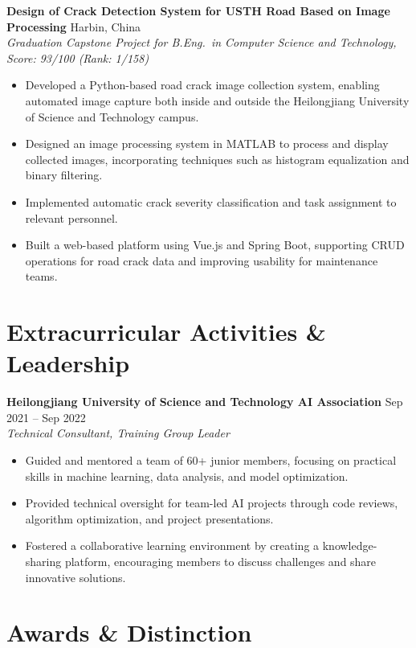\documentclass[10pt,a4paper]{article}
\begin{document}
\textbf{Design of Crack Detection System for USTH Road Based on Image Processing} \hfill Harbin, China\\
\textit{Graduation Capstone Project for B.Eng.\ in Computer Science and Technology, Score: 93/100 (Rank: 1/158)}
\begin{itemize}
    \item Developed a Python-based road crack image collection system, enabling automated image capture both inside and outside the Heilongjiang University of Science and Technology campus.
    \item Designed an image processing system in MATLAB to process and display collected images, incorporating techniques such as histogram equalization and binary filtering.
    \item Implemented automatic crack severity classification and task assignment to relevant personnel.
    \item Built a web-based platform using Vue.js and Spring Boot, supporting CRUD operations for road crack data and improving usability for maintenance teams.
\end{itemize}

\section*{Extracurricular Activities \& Leadership}

\textbf{Heilongjiang University of Science and Technology AI Association} \hfill Sep 2021 -- Sep 2022\\
\textit{Technical Consultant, Training Group Leader}
\begin{itemize}
    \item Guided and mentored a team of 60+ junior members, focusing on practical skills in machine learning, data analysis, and model optimization.
    \item Provided technical oversight for team-led AI projects through code reviews, algorithm optimization, and project presentations.
    \item Fostered a collaborative learning environment by creating a knowledge-sharing platform, encouraging members to discuss challenges and share innovative solutions.
\end{itemize}

\section*{Awards \& Distinction}
\end{document}
